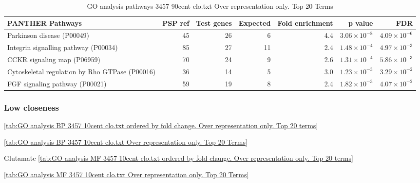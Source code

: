 \begin{table}[ht]
\centering
\begin{adjustbox}{width=\textwidth}

\begin{tabular}{lrrrrrr}
  \hline
PANTHER Pathways & PSP ref & Test genes & Expected & Fold enrichment & p value & FDR \\ 
  \hline
Parkinson disease (P00049) & 45 & 26 & 6 & 4.4 & $3.06 \times 10^{-8}$ & $4.09 \times 10^{-6}$ \\ 
  Integrin signalling pathway (P00034) & 85 & 27 & 11 & 2.4 & $1.48 \times 10^{-4}$ & $4.97 \times 10^{-3}$ \\ 
  CCKR signaling map (P06959) & 70 & 24 & 9 & 2.6 & $1.31 \times 10^{-4}$ & $5.86 \times 10^{-3}$ \\ 
  Cytoskeletal regulation by Rho GTPase (P00016) & 36 & 14 & 5 & 3.0 & $1.23 \times 10^{-3}$ & $3.29 \times 10^{-2}$ \\ 
  FGF signaling pathway (P00021) & 59 & 19 & 8 & 2.4 & $1.82 \times 10^{-3}$ & $4.07 \times 10^{-2}$ \\ 
   \hline
\end{tabular}
\end{adjustbox}
\caption{GO analysis pathways 3457 90cent clo.txt Over representation only. Top 20 Terms} 
\label{tab:GO analysis pathways 3457 90cent clo.txt Over representation only. Top 20 Terms}
\end{table}

\subsubsection{Low closeness} 


\ref{tab:GO analysis BP 3457 10cent clo.txt ordered by fold change. Over representation only. Top 20 terms}

\ref{tab:GO analysis BP 3457 10cent clo.txt Over representation only. Top 20 Terms}

Glutamate
\ref{tab:GO analysis MF 3457 10cent clo.txt ordered by fold change. Over representation only. Top 20 terms}

\ref{tab:GO analysis MF 3457 10cent clo.txt Over representation only. Top 20 Terms}

